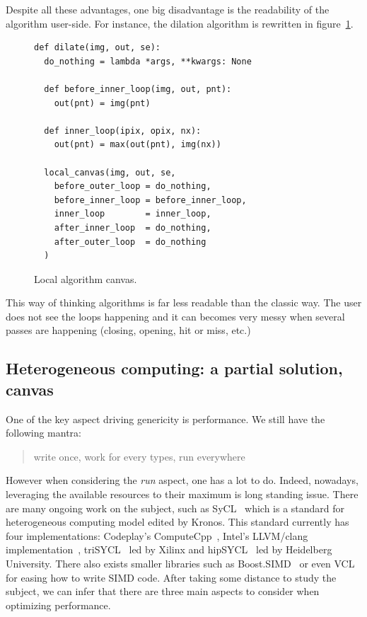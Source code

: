 Despite all these advantages, one big disadvantage is the readability of the algorithm user-side. For instance, the
dilation algorithm is rewritten in figure~\ref{code:local.algorithm.dilate}.

\begin{figure}[htbp]
  \centering
  \begin{verbatim}
def dilate(img, out, se):
  do_nothing = lambda *args, **kwargs: None

  def before_inner_loop(img, out, pnt):
    out(pnt) = img(pnt)

  def inner_loop(ipix, opix, nx):
    out(pnt) = max(out(pnt), img(nx))

  local_canvas(img, out, se,
    before_outer_loop = do_nothing,
    before_inner_loop = before_inner_loop,
    inner_loop        = inner_loop,
    after_inner_loop  = do_nothing,
    after_outer_loop  = do_nothing
  )
  \end{verbatim}

  \caption{Local algorithm canvas.}
  \label{code:local.algorithm.dilate}
\end{figure}

This way of thinking algorithms is far less readable than the classic way. The user does not see the loops happening and
it can becomes very messy when several passes are happening (closing, opening, hit or miss, etc.)



\subsection{Heterogeneous computing: a partial solution, canvas}
\label{subsec:heterogeneous}

One of the key aspect driving genericity is performance. We still have the following mantra: \blockquote{write once,
  work for every types, run everywhere}. However when considering the \emph{run} aspect, one has a lot to do. Indeed,
nowadays, leveraging the available resources to their maximum is long standing issue. There are many ongoing work on
the subject, such as SyCL~\cite{brown.2019.heterogeneous,wong.2019.heterogeneous} which is a standard for
heterogeneous computing model edited by Kronos. This standard currently has four implementations: Codeplay's
ComputeCpp~\parencite{codeplay.2021.computecpp}, Intel’s LLVM/clang implementation~\parencite{intel-llvm.2021.sycl},
triSYCL~\parencite{xilinx.2021.triSYCL} led by Xilinx and hipSYCL~\parencite{aksel.2020.hipsycl} led by Heidelberg
University. There also exists smaller libraries such as Boost.SIMD~\cite{esterie.2014.boostsimd} or even
VCL~\cite{fog.2013.vcl} for easing how to write SIMD code. After taking some distance to study the subject, we can
infer that there are three main aspects to consider when optimizing performance.

